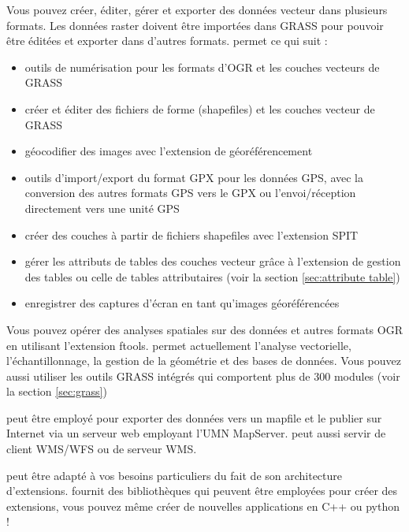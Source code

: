 Vous pouvez créer, éditer, gérer et exporter des données vecteur dans plusieurs formats. Les données raster doivent être importées dans GRASS pour pouvoir être éditées et exporter dans d'autres formats. \qg permet ce qui suit :  

\begin{itemize}[label=--]
\item outils de numérisation pour les formats d'OGR et les couches vecteurs de GRASS
\item créer et éditer des fichiers de forme (shapefiles) et les couches vecteur de GRASS
\item géocodifier des images avec l'extension de géoréférencement
\item outils d'import/export du format GPX pour les données GPS, avec la conversion des autres formats GPS vers le GPX ou l'envoi/réception directement vers une unité GPS
\item créer des couches \pg à partir de fichiers shapefiles avec l'extension SPIT
\item gérer les attributs de tables des couches vecteur grâce à l'extension de gestion des tables ou celle de tables attributaires (voir la section \ref{sec:attribute table})
\item enregistrer des captures d'écran en tant qu'images géoréférencées
\end{itemize}


Vous pouvez opérer des analyses spatiales sur des données \ppg et autres formats OGR en utilisant l'extension ftools. \qg permet actuellement l'analyse vectorielle, l'échantillonnage, la gestion de la géométrie et des bases de données. Vous pouvez aussi utiliser les outils GRASS intégrés qui comportent plus de 300 modules (voir la section \ref{sec:grass})


\qg peut être employé pour exporter des données vers un mapfile et le publier sur Internet via un serveur web employant l'UMN MapServer. \qg peut aussi servir de client WMS/WFS ou de serveur WMS.


\qg peut être adapté à vos besoins particuliers du fait de son architecture d'extensions. \qg fournit des bibliothèques qui peuvent être employées pour créer des extensions, vous pouvez même créer de nouvelles applications en C++ ou python !

